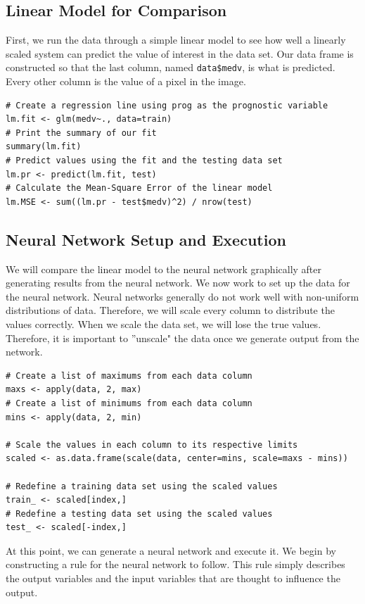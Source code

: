 \subsection{Linear Model for Comparison}

First, we run the data through a simple linear model to see how well a linearly scaled system can predict the value of interest in the data set. Our data frame is constructed so that the last column, named \verb|data$medv|, is what is predicted. Every other column is the value of a pixel in the image.

\begin{lstlisting}
# Create a regression line using prog as the prognostic variable
lm.fit <- glm(medv~., data=train)
# Print the summary of our fit
summary(lm.fit)
# Predict values using the fit and the testing data set
lm.pr <- predict(lm.fit, test)
# Calculate the Mean-Square Error of the linear model
lm.MSE <- sum((lm.pr - test$medv)^2) / nrow(test)
\end{lstlisting}

\subsection{Neural Network Setup and Execution}

We will compare the linear model to the neural network graphically after generating results from the neural network. We now work to set up the data for the neural network. Neural networks generally do not work well with non-uniform distributions of data. Therefore, we will scale every column to distribute the values correctly. When we scale the data set, we will lose the true values. Therefore, it is important to ''unscale" the data once we generate output from the network.

\begin{lstlisting}
# Create a list of maximums from each data column
maxs <- apply(data, 2, max)
# Create a list of minimums from each data column
mins <- apply(data, 2, min)

# Scale the values in each column to its respective limits
scaled <- as.data.frame(scale(data, center=mins, scale=maxs - mins))

# Redefine a training data set using the scaled values
train_ <- scaled[index,]
# Redefine a testing data set using the scaled values
test_ <- scaled[-index,]
\end{lstlisting}

At this point, we can generate a neural network and execute it. We begin by constructing a rule for the neural network to follow. This rule simply describes the output variables and the input variables that are thought to influence the output. 

